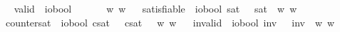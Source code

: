 \begin{isabellebody}
{}
\isamarkuptrue%
\ \isamarkupfalse%
\ valid\ {\isacharcolon}{\isacharcolon}\ {\isachardoublequoteopen}io{\isasymRightarrow}bool{\isachardoublequoteclose}\ {\isacharparenleft}{\isachardoublequoteopen}{\isasymlfloor}{\isacharunderscore}{\isasymrfloor}{\isachardoublequoteclose}\ {\isacharbrackleft}{}{\isacharbrackright}{\isacharparenright}\ \ {\isachardoublequoteopen}{\isasymlfloor}{\isasympsi}{\isasymrfloor}\ {\isasymequiv}\ \ {\isasymforall}w{\isachardot}{\isacharparenleft}{\isasympsi}\ w{\isacharparenright}{\isachardoublequoteclose}\isanewline
\ \isamarkupfalse%
\ satisfiable\ {\isacharcolon}{\isacharcolon}\ {\isachardoublequoteopen}io{\isasymRightarrow}bool{\isachardoublequoteclose}\ {\isacharparenleft}{\isachardoublequoteopen}{\isasymlfloor}{\isacharunderscore}{\isasymrfloor}\isactrlsup s\isactrlsup a\isactrlsup t{\isachardoublequoteclose}\ {\isacharbrackleft}{}{\isacharbrackright}{\isacharparenright}\ \ {\isachardoublequoteopen}{\isasymlfloor}{\isasympsi}{\isasymrfloor}\isactrlsup s\isactrlsup a\isactrlsup t\ {\isasymequiv}\ {\isasymexists}w{\isachardot}{\isacharparenleft}{\isasympsi}\ w{\isacharparenright}{\isachardoublequoteclose}\isanewline
\ \isamarkupfalse%
\ countersat\ {\isacharcolon}{\isacharcolon}\ {\isachardoublequoteopen}io{\isasymRightarrow}bool{\isachardoublequoteclose}\ {\isacharparenleft}{\isachardoublequoteopen}{\isasymlfloor}{\isacharunderscore}{\isasymrfloor}\isactrlsup c\isactrlsup s\isactrlsup a\isactrlsup t{\isachardoublequoteclose}\ {\isacharbrackleft}{}{\isacharbrackright}{\isacharparenright}\ \ {\isachardoublequoteopen}{\isasymlfloor}{\isasympsi}{\isasymrfloor}\isactrlsup c\isactrlsup s\isactrlsup a\isactrlsup t\ {\isasymequiv}\ \ {\isasymexists}w{\isachardot}{\isasymnot}{\isacharparenleft}{\isasympsi}\ w{\isacharparenright}{\isachardoublequoteclose}\isanewline
\ \isamarkupfalse%
\ invalid\ {\isacharcolon}{\isacharcolon}\ {\isachardoublequoteopen}io{\isasymRightarrow}bool{\isachardoublequoteclose}\ {\isacharparenleft}{\isachardoublequoteopen}{\isasymlfloor}{\isacharunderscore}{\isasymrfloor}\isactrlsup i\isactrlsup n\isactrlsup v{\isachardoublequoteclose}\ {\isacharbrackleft}{}{\isacharbrackright}{\isacharparenright}\ \ {\isachardoublequoteopen}{\isasymlfloor}{\isasympsi}{\isasymrfloor}\isactrlsup i\isactrlsup n\isactrlsup v\ {\isasymequiv}\ {\isasymforall}w{\isachardot}{\isasymnot}{\isacharparenleft}{\isasympsi}\ w{\isacharparenright}{\isachardoublequoteclose}%

\end{isabellebody}
